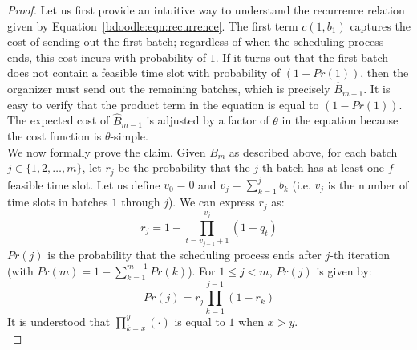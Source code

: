 \begin{proof}
Let us first provide an intuitive way to understand the recurrence relation given by Equation~\ref{bdoodle:eqn:recurrence}. The first term $c(1, b_1)$ captures the cost of sending out the first batch; regardless of when the scheduling process ends, this cost incurs with probability of $1$. If it turns out that the first batch does not contain a feasible time slot with probability of $(1 - Pr(1))$, then the organizer must send out the remaining batches, which is precisely $\hat{B}_{m-1}$. It is easy to verify that the product term in the equation is equal to $(1 - Pr(1))$. The expected cost of $\hat{B}_{m-1}$ is adjusted by a factor of $\theta$ in the equation because the cost function is $\theta$-simple. \\

We now formally prove the claim. Given $B_{m}$ as described above, for each batch $j \in \{1, 2, \dots, m\}$, let $r_j$ be the probability that the $j$-th batch has at least one $f$-feasible time slot. Let us define $v_0 = 0$ and $v_j = \sum_{k=1}^{j} b_k$ (i.e. $v_j$ is the number of time slots in batches $1$ through $j$).
We can express $r_j$ as:
\begin{equation} \label{bdoodle:eqn:r_j}
r_j = 1 - \prod_{t=v_{j-1} + 1}^{v_j} (1 - q_t)
\end{equation}
$Pr(j)$ is the probability that the scheduling process ends after $j$-th iteration (with $Pr(m) = 1 - \sum_{k=1}^{m-1} Pr(k)$). For $1 \leq j < m$, $Pr(j)$ is given by:
\begin{equation} \label{bdoodle:eqn:Pr_j}
Pr(j) =  r_j  \prod_{k=1}^{j-1} (1 - r_k)   
\end{equation}
It is understood that $\prod_{k=x}^{y} (\cdot)$ is equal to $1$ when $x > y$. \\
	

\end{proof}
